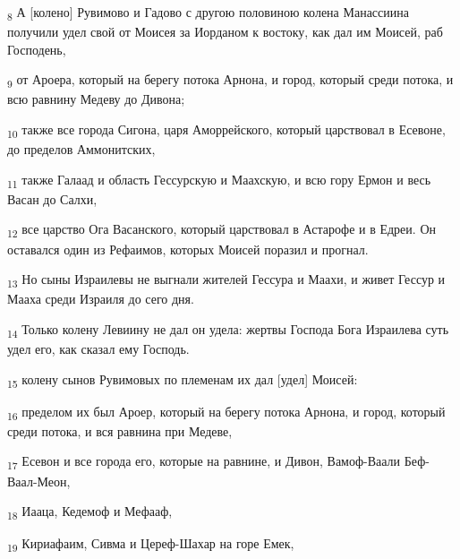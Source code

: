 \begin{tcolorbox}
\textsubscript{8} А [колено] Рувимово и Гадово с другою половиною колена Манассиина получили удел свой от Моисея за Иорданом к востоку, как дал им Моисей, раб Господень,
\end{tcolorbox}
\begin{tcolorbox}
\textsubscript{9} от Ароера, который на берегу потока Арнона, и город, который среди потока, и всю равнину Медеву до Дивона;
\end{tcolorbox}
\begin{tcolorbox}
\textsubscript{10} также все города Сигона, царя Аморрейского, который царствовал в Есевоне, до пределов Аммонитских,
\end{tcolorbox}
\begin{tcolorbox}
\textsubscript{11} также Галаад и область Гессурскую и Маахскую, и всю гору Ермон и весь Васан до Салхи,
\end{tcolorbox}
\begin{tcolorbox}
\textsubscript{12} все царство Ога Васанского, который царствовал в Астарофе и в Едреи. Он оставался один из Рефаимов, которых Моисей поразил и прогнал.
\end{tcolorbox}
\begin{tcolorbox}
\textsubscript{13} Но сыны Израилевы не выгнали жителей Гессура и Маахи, и живет Гессур и Мааха среди Израиля до сего дня.
\end{tcolorbox}
\begin{tcolorbox}
\textsubscript{14} Только колену Левиину не дал он удела: жертвы Господа Бога Израилева суть удел его, как сказал ему Господь.
\end{tcolorbox}
\begin{tcolorbox}
\textsubscript{15} колену сынов Рувимовых по племенам их дал [удел] Моисей:
\end{tcolorbox}
\begin{tcolorbox}
\textsubscript{16} пределом их был Ароер, который на берегу потока Арнона, и город, который среди потока, и вся равнина при Медеве,
\end{tcolorbox}
\begin{tcolorbox}
\textsubscript{17} Есевон и все города его, которые на равнине, и Дивон, Вамоф-Ваали Беф-Ваал-Меон,
\end{tcolorbox}
\begin{tcolorbox}
\textsubscript{18} Иааца, Кедемоф и Мефааф,
\end{tcolorbox}
\begin{tcolorbox}
\textsubscript{19} Кириафаим, Сивма и Цереф-Шахар на горе Емек,
\end{tcolorbox}
